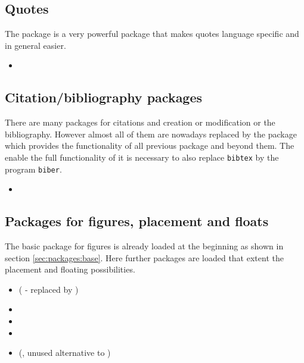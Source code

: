
\subsection{Quotes}

The package  is a very powerful package that makes quotes language specific and in general easier.

\begin{itemize}[noitemsep]
\item {}
\end{itemize}


\subsection{Citation/bibliography packages}

There are many packages for citations and creation or modification or the bibliography. However almost all of them are nowadays replaced by the package 
 which provides the functionality of all previous package and beyond them. The enable the full functionality of  it is necessary to also replace \texttt{bibtex} by the program \texttt{biber}.

\begin{itemize}[noitemsep]
\item {}
\end{itemize}


\subsection{Packages for figures, placement and floats}
The basic package  for figures is already loaded at the beginning as shown in section \ref{sec:packages:base}. Here further packages are loaded that extent the placement and floating possibilities.

\begin{itemize}[noitemsep]
\item (  - replaced by )
\item {}
\item {}
\item {}
\item (, unused alternative to )
\end{itemize}

